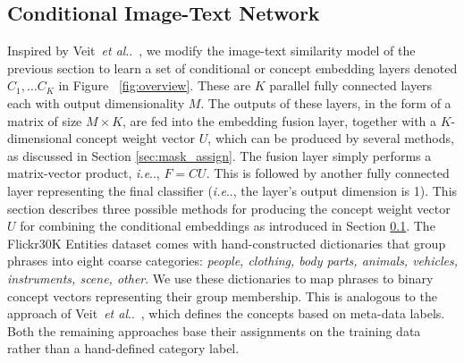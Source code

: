 \documentclass[runningheads]{llncs}
\makeatletter
\DeclareRobustCommand\onedot{\futurelet\@let@token\@onedot}
\def\@onedot{\ifx\@let@token.\else.\null\fi\xspace}
\def\ie{\emph{i.e}\onedot} \def\Ie{\emph{I.e}\onedot}
\def\etal{\emph{et al}\onedot}
\makeatother
\begin{document}
\subsection{Conditional Image-Text Network}\label{sec:cond_im_text}
Inspired by Veit~\etal~\cite{veitCVPR2017}, we modify the image-text similarity model of the previous section to learn a set of conditional or concept embedding layers denoted $C_1, \ldots C_K$ in Figure ~\ref{fig:overview}. These are $K$ parallel fully connected layers each with output dimensionality $M$. The outputs of these layers, in the form of a matrix of size $M \times K$, are fed into the embedding fusion layer, together with a $K$-dimensional concept weight vector $U$, which can be produced by several methods, as discussed in Section \ref{sec:mask_assign}. The fusion layer simply performs a matrix-vector product, \ie, $F = CU$. This is followed by another fully connected layer representing the final classifier (\ie, the layer's output dimension is 1).
This section describes three possible methods for producing the concept weight vector $U$ for combining the conditional embeddings as introduced in Section \ref{sec:cond_im_text}.
\smallskip{}  The Flickr30K Entities dataset comes with hand-constructed dictionaries that group phrases into eight coarse categories: \emph{people, clothing, body parts, animals, vehicles, instruments, scene, other}.  We use these dictionaries to map phrases to binary concept vectors representing their group membership.  This is analogous to the approach of Veit~\etal~\cite{veitCVPR2017}, which defines the concepts based on meta-data labels.  Both the remaining approaches base their assignments on the training data rather than a hand-defined category label.
\end{document}
